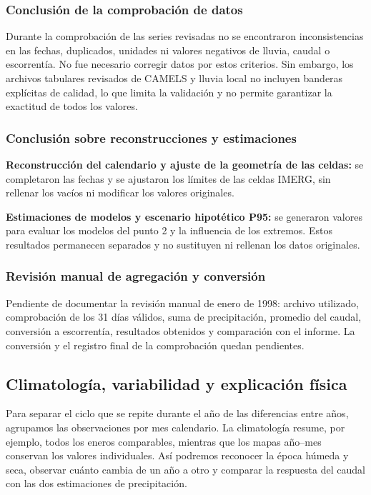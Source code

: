 \documentclass[10pt,a4paper]{article}
\begin{document}
\subsubsection*{Conclusión de la comprobación de datos}
Durante la comprobación de las series revisadas no se encontraron inconsistencias en las fechas, duplicados, unidades ni valores negativos de lluvia, caudal o escorrentía. No fue necesario corregir datos por estos criterios. Sin embargo, los archivos tabulares revisados de CAMELS y lluvia local no incluyen banderas explícitas de calidad, lo que limita la validación y no permite garantizar la exactitud de todos los valores.



\subsubsection*{Conclusión sobre reconstrucciones y estimaciones}
\textbf{Reconstrucción del calendario y ajuste de la geometría de las celdas:} se completaron las fechas y se ajustaron los límites de las celdas IMERG, sin rellenar los vacíos ni modificar los valores originales.

\textbf{Estimaciones de modelos y escenario hipotético P95:} se generaron valores para evaluar los modelos del punto 2 y la influencia de los extremos. Estos resultados permanecen separados y no sustituyen ni rellenan los datos originales.

\subsubsection*{Revisión manual de agregación y conversión}
Pendiente de documentar la revisión manual de enero de 1998: archivo utilizado, comprobación de los 31 días válidos, suma de precipitación, promedio del caudal, conversión a escorrentía, resultados obtenidos y comparación con el informe. La conversión y el registro final de la comprobación quedan pendientes.
\subsection{Climatología, variabilidad y explicación física}
Para separar el ciclo que se repite durante el año de las diferencias entre años, agrupamos las observaciones por mes calendario. La climatología resume, por ejemplo, todos los eneros comparables, mientras que los mapas año--mes conservan los valores individuales. Así podremos reconocer la época húmeda y seca, observar cuánto cambia de un año a otro y comparar la respuesta del caudal con las dos estimaciones de precipitación.
\end{document}
